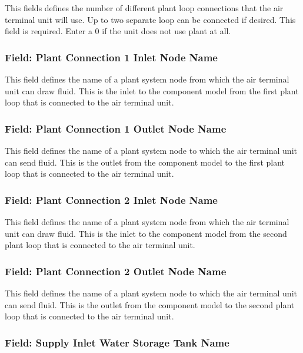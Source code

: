 This fields defines the number of different plant loop connections that the air terminal unit will use. Up to two separate loop can be connected if desired. This field is required. Enter a 0 if the unit does not use plant at all.

\subsubsection{Field: Plant Connection 1 Inlet Node Name}\label{field-plant-connection-1-inlet-node-name-1}

This field defines the name of a plant system node from which the air terminal unit can draw fluid. This is the inlet to the component model from the first plant loop that is connected to the air terminal unit.

\subsubsection{Field: Plant Connection 1 Outlet Node Name}\label{field-plant-connection-1-outlet-node-name-1}

This field defines the name of a plant system node to which the air terminal unit can send fluid. This is the outlet from the component model to the first plant loop that is connected to the air terminal unit.

\subsubsection{Field: Plant Connection 2 Inlet Node Name}\label{field-plant-connection-2-inlet-node-name-1}

This field defines the name of a plant system node from which the air terminal unit can draw fluid. This is the inlet to the component model from the second plant loop that is connected to the air terminal unit.

\subsubsection{Field: Plant Connection 2 Outlet Node Name}\label{field-plant-connection-2-outlet-node-name-1}

This field defines the name of a plant system node to which the air terminal unit can send fluid. This is the outlet from the component model to the second plant loop that is connected to the air terminal unit.

\subsubsection{Field: Supply Inlet Water Storage Tank Name}\label{field-supply-inlet-water-storage-tank-name-1}

